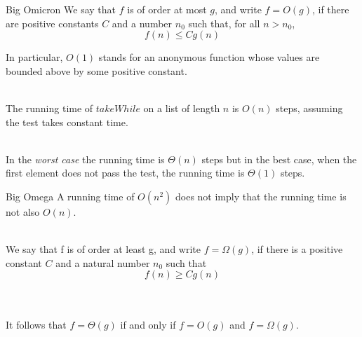 \documentclass{beamer}
\begin{document}
\begin{frame}{Big Omicron}
  We say that $f$ is of order at most $g$, and write $f = O(g)$, if there
  are positive constants $C$ and a number $n_0$ such that, for
  all $n > n_0$,
  \[ f(n) \leq C g(n) \]

  In particular, $O(1)$ stands for an anonymous function whose values
  are bounded above by some positive constant.\\~\

  The running time of $takeWhile$ on a list of length $n$ is $O(n)$
  steps, assuming the test takes constant time.\\~\

  In the \emph{worst case} the running time is $\Theta(n)$ steps but in the
  best case, when the first element does not pass the test, the
  running time is $\Theta(1)$ steps.
\end{frame}

\begin{frame}{Big Omega}
  A running time of $O(n^2)$ does not imply that the running time is not
  also $O(n)$.\\~\

  We say that f is of order at least g, and write $f = \Omega(g)$, if
  there is a positive constant $C$ and a natural number $n_0$ such that
  \[ f(n) \geq C g(n)\]\\~\

  It follows that $f=\Theta(g)$ if and only if $f=O(g)$ and
  $f =\Omega(g)$.
\end{frame}
\end{document}
